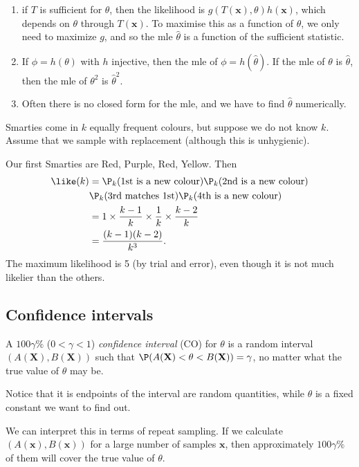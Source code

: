\documentclass[a4paper]{article}
\begin{document}
\note
\begin{enumerate}
  \item if $T$ is sufficient for $\theta$, then the likelihood is $g(T(\mathbf{x}), \theta)h(\mathbf{x})$, which depends on $\theta$ through $T(\mathbf{x})$. To maximise this as a function of $\theta$, we only need to maximize $g$, and so the mle $\hat{\theta}$ is a function of the sufficient statistic.
  \item If $\phi = h(\theta)$ with $h$ injective, then the mle of $\phi =h(\hat{\theta})$. If the mle of $\theta$ is $\hat{\theta}$, then the mle of $\theta^2$ is $\hat{\theta}^2$.
  \item Often there is no closed form for the mle, and we have to find $\hat{\theta}$ numerically.
\end{enumerate}

\begin{eg}
  Smarties come in $k$ equally frequent colours, but suppose we do not know $k$. Assume that we sample with replacement (although this is unhygienic).

  Our first Smarties are Red, Purple, Red, Yellow. Then
  \begin{align*}
  \like(k)&=\P_k(\text{1st is a new colour})\P_k(\text{2nd is a new colour})\\\
  & \P_k(\text{3rd matches 1st})\P_k(\text{4th is a new colour})\\
  &= 1\times \frac{k - 1}{k}\times \frac{1}{k}\times \frac{k - 2}{k}\\
  &= \frac{(k - 1)(k - 2)}{k^3}.
\end{align*}
The maximum likelihood is 5 (by trial and error), even though it is not much likelier than the others.
\end{eg}

\subsection{Confidence intervals}
\begin{defi}
  A $100\gamma\%$ ($0 < \gamma < 1$) \emph{confidence interval} (CO) for $\theta$ is a random interval $(A(\mathbf{X}), B(\mathbf{X}))$ such that $\P(A(\mathbf{X}) < \theta < B(\mathbf{X})) = \gamma$, no matter what the true value of $\theta$ may be.
\end{defi}

Notice that it is endpoints of the interval are random quantities, while $\theta$ is a fixed constant we want to find out.

We can interpret this in terms of repeat sampling. If we calculate $(A(\mathbf{x}), B(\mathbf{x}))$ for a large number of samples $\mathbf{x}$, then approximately $100\gamma\%$ of them will cover the true value of $\theta$.
\end{document}
